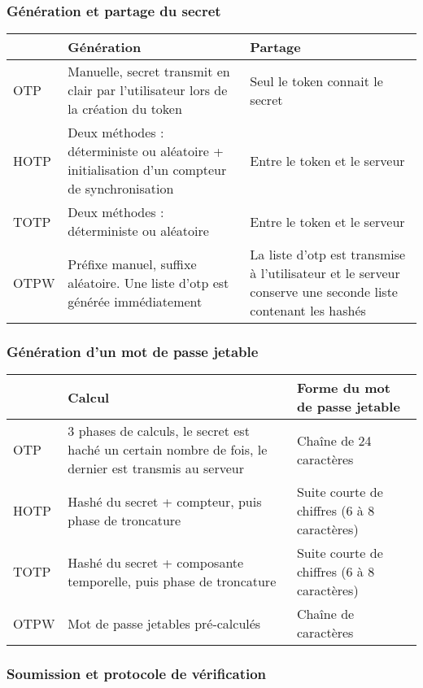 \subsubsection{Génération et partage du secret}

	\begin{tabular}{| p{3cm} | p{6cm} | p{6cm} |}
		\hline
		& \cellcolor{gray} Génération & \cellcolor{gray} Partage \\
		\hline
		OTP & Manuelle, secret transmit en clair par l'utilisateur lors de la
		création du token & Seul le token connait le secret \\
		\hline
		HOTP & Deux méthodes : déterministe ou aléatoire + initialisation d'un
		compteur de synchronisation & Entre le token et le serveur \\
		\hline
		TOTP & Deux méthodes : déterministe ou aléatoire & Entre le token et
		le serveur \\
		\hline
		OTPW & Préfixe manuel, suffixe aléatoire. Une liste d'otp est générée
		immédiatement & La liste d'otp est transmise à l'utilisateur et le
		serveur conserve une seconde liste contenant les hashés \\
		\hline
	\end{tabular}

\subsubsection{Génération d'un mot de passe jetable}

	\begin{tabular}{| p{3cm} | p{6cm} | p{6cm} |}
		\hline
		& \cellcolor{gray} Calcul & \cellcolor{gray} Forme du mot de passe
		jetable \\
		\hline
		OTP & 3 phases de calculs, le secret est haché un certain nombre de
		fois, le dernier est transmis au serveur & Chaîne de 24 caractères \\
		\hline
		HOTP & Hashé du secret + compteur, puis phase de troncature & Suite
		courte de chiffres (6 à 8 caractères) \\
		\hline
		TOTP & Hashé du secret + composante temporelle, puis phase de
		troncature & Suite courte de chiffres (6 à 8 caractères) \\
		\hline
		OTPW & Mot de passe jetables pré-calculés & Chaîne de caractères \\
		\hline
	\end{tabular}

\subsubsection{Soumission et protocole de vérification}


